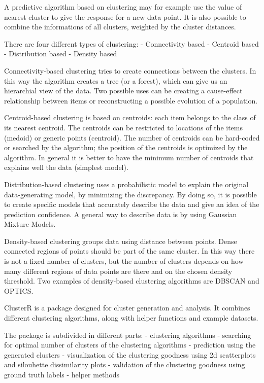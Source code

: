 \documentclass[
]{article}
\begin{document}
A predictive algorithm based on clustering may for example use the value
of nearest cluster to give the response for a new data point. It is also
possible to combine the informations of all clusters, weighted by the
cluster distances.

There are four different types of clustering: - Connectivity based -
Centroid based - Distribution based - Density based

Connectivity-based clustering tries to create connections between the
clusters. In this way the algorithm creates a tree (or a forest), which
can give us an hierarchial view of the data. Two possible uses can be
creating a cause-effect relationship between items or reconstructing a
possible evolution of a population.

Centroid-based clustering is based on centroids: each item belongs to
the class of its nearest centroid. The centroids can be restricted to
locations of the items (medoid) or generic points (centroid). The number
of centroids can be hard-coded or searched by the algorithm; the
position of the centroids is optimized by the algorithm. In general it
is better to have the minimum number of centroids that explains well the
data (simplest model).

Distribution-based clustering uses a probabilistic model to explain the
original data-generating model, by minimizing the discrepancy. By doing
so, it is possible to create specific models that accurately describe
the data and give an idea of the prediction confidence. A general way to
describe data is by using Gaussian Mixture Models.

Density-based clustering groups data using distance between points.
Dense connected regions of points should be part of the same cluster. In
this way there is not a fixed number of clusters, but the number of
clusters depends on how many different regions of data points are there
and on the chosen density threshold. Two examples of density-based
clustering algorithms are DBSCAN and OPTICS.

ClusterR is a package designed for cluster generation and analysis. It
combines different clustering algorithms, along with helper functions
and example datasets.

The package is subdivided in different parts: - clustering algorithms -
searching for optimal number of clusters of the clustering algorithms -
prediction using the generated clusters - visualization of the
clustering goodness using 2d scatterplots and silouhette dissimilarity
plots - validation of the clustering goodness using ground truth labels
- helper methods
\end{document}

